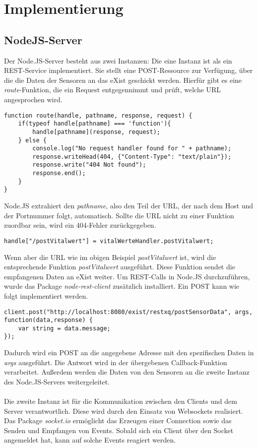 \section{Implementierung}

\subsection{NodeJS-Server}
Der Node.JS-Server besteht aus zwei Instanzen: Die eine Instanz ist als ein REST-Service implementiert. Sie stellt eine POST-Ressource zur Verfügung, über die die Daten der Sensoren an das eXist geschickt werden. Hierfür gibt es eine \textit{route}-Funktion, die ein Request entgegennimmt und prüft, welche URL angesprochen wird. 

\begin{lstlisting}
function route(handle, pathname, response, request) {
    if(typeof handle[pathname] === 'function'){
        handle[pathname](response, request);
    } else {
        console.log("No request handler found for " + pathname);
        response.writeHead(404, {"Content-Type": "text/plain"});
        response.write("404 Not found");
        response.end();
    }
}
\end{lstlisting}

Node.JS extrahiert den \textit{pathname}, also den Teil der URL, der nach dem Host und der Portnummer folgt, automatisch. Sollte die URL nicht zu einer Funktion zuordbar sein, wird ein 404-Fehler zurückgegeben.

\begin{lstlisting}
handle["/postVitalwert"] = vitalWerteHandler.postVitalwert;
\end{lstlisting}

Wenn aber die URL wie im obigen Beispiel \textit{postVitalwert} ist, wird die entsprechende Funktion \textit{postVitalwert} ausgeführt. Diese Funktion sendet die empfangenen Daten an eXist weiter. Um REST-Calls in Node.JS durchzuführen, wurde das Package \textit{node-rest-client} zusätzlich installiert. Ein POST kann wie folgt implementiert werden.

\begin{lstlisting}
client.post("http://localhost:8080/exist/restxq/postSensorData", args, function(data,response) {
    var string = data.message;
});
\end{lstlisting}

Dadurch wird ein POST an die angegebene Adresse mit den spezifischen Daten in \textit{args} ausgeführt. Die Antwort wird in der übergebenen Callback-Funktion verarbeitet. Außerdem  werden die Daten von den Sensoren an die zweite Instanz des Node.JS-Servers weitergeleitet.
\\
\\
Die zweite Instanz ist für die Kommunikation zwischen den Clients und dem Server verantwortlich. Diese wird durch den Einsatz von Websockets realisiert. Das Package \textit{socket.io} ermöglicht das Erzeugen einer Connection sowie das Senden und Empfangen von Events. Sobald sich ein Client über den Socket angemeldet hat, kann auf solche Events reagiert werden.

